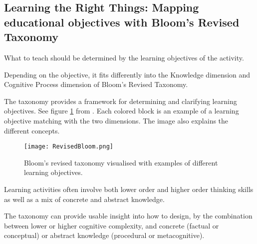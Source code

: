 


%


  \subsection{Learning the Right Things: Mapping educational objectives with Bloom's Revised Taxonomy}

  What to teach should be determined by the learning objectives of the activity.

  Depending on the objective, it fits differently into the Knowledge dimension and Cognitive Process dimension of Bloom's Revised Taxonomy. \cite{bloom}

  The taxonomy provides a framework for determining and clarifying learning objectives. See figure \ref{fig:revised-bloom} from \cite{heer}. Each colored block is an example of a learning objective matching with the two dimensions. The image also explains the different concepts.

  \begin{figure}[h]
    \centering
    \texttt{[image: RevisedBloom.png]}
    \caption{Bloom's revised taxonomy visualised with examples of different learning objectives.}
    \label{fig:revised-bloom}
\end{figure}

  Learning activities often involve both lower order and higher order thinking skills as well as a mix of concrete and abstract knowledge.

  The taxonomy can provide usable insight into how to design, by the combination between lower or higher cognitive complexity, and concrete (factual or conceptual) or abstract knowledge (procedural or metacognitive). \cite{cheong}

